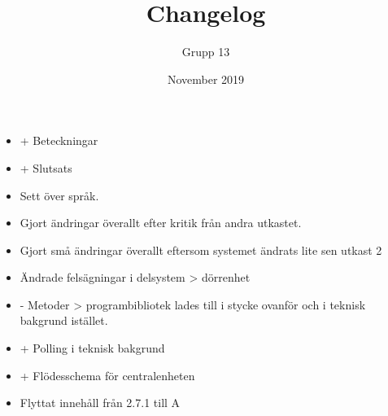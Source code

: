 \documentclass{article}
\title{Changelog}
\author{Grupp 13}
\date{November 2019}
\begin{document}
\maketitle
\begin{itemize}
    \item + Beteckningar
    \item + Slutsats
    \item Sett över språk.
    \item Gjort ändringar överallt efter kritik från andra utkastet. 
    \item Gjort små ändringar överallt eftersom systemet ändrats lite sen utkast 2
    \item Ändrade felsägningar i delsystem > dörrenhet
    \item - Metoder > programbibliotek lades till i stycke ovanför och i teknisk bakgrund istället.
    \item + Polling i teknisk bakgrund
    \item + Flödesschema för centralenheten
    \item Flyttat innehåll från 2.7.1 till A
\end{itemize}
\end{document}
